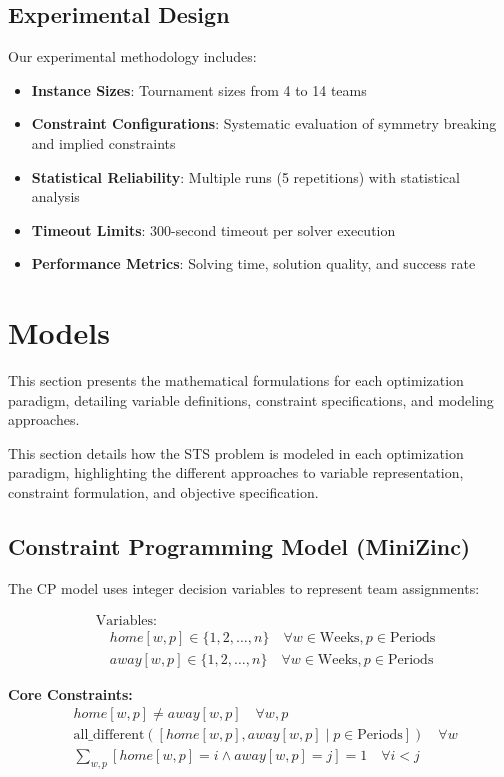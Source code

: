 \documentclass[11pt]{article}
\begin{document}
\subsection{Experimental Design}

Our experimental methodology includes:
\begin{itemize}
    \item \textbf{Instance Sizes}: Tournament sizes from 4 to 14 teams
    \item \textbf{Constraint Configurations}: Systematic evaluation of symmetry breaking and implied constraints
    \item \textbf{Statistical Reliability}: Multiple runs (5 repetitions) with statistical analysis
    \item \textbf{Timeout Limits}: 300-second timeout per solver execution
    \item \textbf{Performance Metrics}: Solving time, solution quality, and success rate
\end{itemize}

\section{Models}

This section presents the mathematical formulations for each optimization paradigm, detailing variable definitions, constraint specifications, and modeling approaches.

This section details how the STS problem is modeled in each optimization paradigm, highlighting the different approaches to variable representation, constraint formulation, and objective specification.

\subsection{Constraint Programming Model (MiniZinc)}

The CP model uses integer decision variables to represent team assignments:

\begin{align}
&\text{Variables:} \\
&\quad home[w,p] \in \{1, 2, \ldots, n\} \quad \forall w \in \text{Weeks}, p \in \text{Periods} \\
&\quad away[w,p] \in \{1, 2, \ldots, n\} \quad \forall w \in \text{Weeks}, p \in \text{Periods}
\end{align}

\textbf{Core Constraints:}
\begin{align}
&home[w,p] \neq away[w,p] \quad \forall w,p \\
&\text{all\_different}([home[w,p], away[w,p] \mid p \in \text{Periods}]) \quad \forall w \\
&\sum_{w,p} [home[w,p] = i \land away[w,p] = j] = 1 \quad \forall i < j
\end{align}
\end{document}
